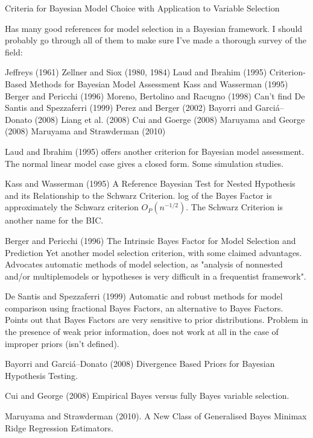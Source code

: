 \documentclass{amsart}[12pt]
\begin{document}
Criteria for Bayesian Model Choice with Application to Variable Selection

Has many good references for model selection in a Bayesian framework. I should probably go through all of them
to make sure I've made a thorough survey of the field:

Jeffreys (1961)
Zellner and Siox (1980, 1984)
Laud and Ibrahim (1995) Criterion-Based Methods for Bayesian Model Assessment
Kass and Wasserman (1995)
Berger and Pericchi (1996)
Moreno, Bertolino and Racugno (1998) Can't find
De Santis and Spezzaferri (1999)
Perez and Berger (2002)
Bayorri and Garci\'{a}--Donato (2008)
Liang et al. (2008)
Cui and Goerge (2008)
Maruyama and George (2008)
Maruyama and Strawderman (2010)

Laud and Ibrahim (1995) offers another criterion for Bayesian model assessment. The normal linear model case
gives a closed form. Some simulation studies.

Kass and Wasserman (1995) A Reference Bayesian Test for Nested Hypothesis and its Relationship to the
Schwarz Criterion. log of the Bayes Factor is approximately the Schwarz criterion $O_P(n^{-1/2})$. The
Schwarz Criterion is another name for the BIC.

Berger and Pericchi (1996) The Intrinsic Bayes Factor for Model Selection and Prediction
Yet another model selection criterion, with some claimed advantages. Advocates automatic methods of model 
selection, as "analysis of nonnested and/or multiplemodels or hypotheses is very difficult in a frequentist
framework".

De Santis and Spezzaferri (1999) Automatic and robust methods for model comparison using fractional Bayes
Factors, an alternative to Bayes Factors. Points out that Bayes Factors are very sensitive to prior
distributions. Problem in the presence of weak prior information, does not work at all in the case of improper
priors (isn't defined).

Bayorri and Garci\'{a}--Donato (2008) Divergence Based Priors for Bayesian Hypothesis Testing.

Cui and George (2008) Empirical Bayes versus fully Bayes variable selection.

Maruyama and Strawderman (2010). A New Class of Generalised Bayes Minimax Ridge Regression Estimators.
\end{document}
